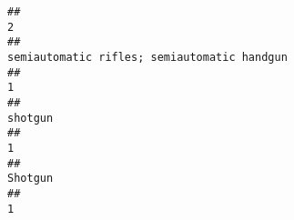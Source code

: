 \documentclass[
]{article}
\begin{document}
\begin{verbatim}
##                                                                                                                                                                                                                                                                                                                                                                                                     2 
##                                                                                                                                                                                                                                                                                                                                                           semiautomatic rifles; semiautomatic handgun 
##                                                                                                                                                                                                                                                                                                                                                                                                     1 
##                                                                                                                                                                                                                                                                                                                                                                                               shotgun 
##                                                                                                                                                                                                                                                                                                                                                                                                     1 
##                                                                                                                                                                                                                                                                                                                                                                                               Shotgun 
##                                                                                                                                                                                                                                                                                                                                                                                                     1 

\end{verbatim}
\end{document}
